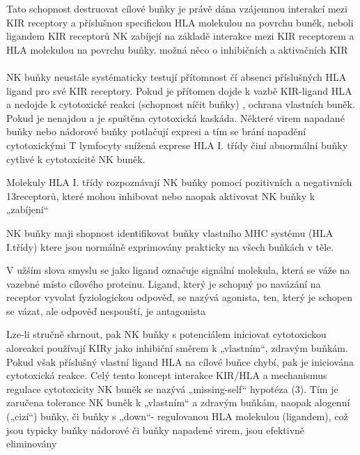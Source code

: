 \documentclass[czech,DP]{thesiskiv}
\begin{document}
Tato schopnost destruovat cílové buňky je právě dána vzájemnou
interakcí mezi KIR receptory a příslušnou specifickou HLA molekulou
na povrchu buněk, neboli ligandem KIR receptorů
NK zabíjejí na základě interakce mezi KIR receptorem a HLA molekulou na povrchu buňky.
možná něco o inhibičních a aktivačních KIR 
\\
\\
NK buňky neustále systématicky testují přítomnost čí absenci příslušných HLA ligand pro své KIR receptory. Pokud je přítomen dojde k vazbě KIR-ligand HLA a nedojde k cytotoxické reakci (schopnost níčit buňky) , ochrana vlastních buněk. Pokud je 
nenajdou a je spuštěna cytotoxická kaskáda.
Některé virem napadané buňky nebo nádorové buňky potlačují expresi a tím se brání napadění cytotoxickými T lymfocyty
snížená exprese HLA I. třídy činí abnormální buňky cytlivé k cytotoxicitě NK buněk.

 Molekuly HLA I. třídy rozpoznávají NK buňky pomocí pozitivních a negativních
13receptorů, které mohou inhibovat nebo naopak aktivovat NK buňky k „zabíjení“

NK buňky maji shopnost identifikovat buňky vlastního MHC systému (HLA I.třídy) ktere jsou normálně exprimovány prakticky na všech buňkách v těle. 

V užším slova smyslu se jako ligand označuje signální molekula, která se váže na vazebné místo cílového proteinu. Ligand, který je schopný po navázání na receptor vyvolat fyziologickou odpověď, se nazývá agonista, ten, který je schopen se vázat, ale odpověď nespouští, je antagonista

Lze-li stručně shrnout, pak NK buňky s potenciálem iniciovat
cytotoxickou aloreakci používají KIRy jako inhibiční směrem k
„vlastním“, zdravým buňkám. Pokud však příslušný vlastní ligand
HLA na cílové buňce chybí, pak je iniciována cytotoxická reakce.
Celý tento koncept interakce KIR/HLA
a mechanismus regulace
cytotoxicity NK buněk se nazývá „missing-self“ hypotéza (3). Tím je
zaručena tolerance NK buněk k „vlastním“ a zdravým buňkám,
naopak alogenní („cizí“) buňky, či buňky s „down“- regulovanou HLA
molekulou (ligandem), což jsou typicky buňky nádorové či buňky
napadené virem, jsou efektivně eliminovány
\end{document}
